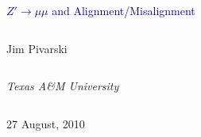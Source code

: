 \documentclass[compress]{beamer}
\begin{document}
\begin{frame}
\vfill
\begin{center}
\textcolor{darkblue}{\Large $Z' \to \mu\mu$ and Alignment/Misalignment}

\vfill
\begin{columns}
\begin{center}
\large
Jim Pivarski
\end{center}
\end{columns}

\begin{columns}
\begin{center}
\scriptsize
{\it Texas A\&M University}
\end{center}
\end{columns}

\vfill
27 August, 2010

\end{center}
\end{frame}


\small
\end{document}
